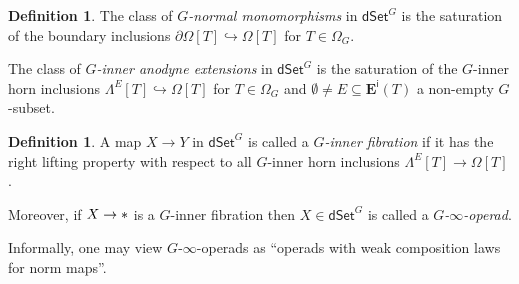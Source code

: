 \documentclass[a4paper,10pt
,draft
]{article}%
\numberwithin{equation}{section}
\numberwithin{figure}{section}
\theoremstyle{definition} %
\newtheorem{definition}[equation]{Definition}%
\newtheorem{example}[equation]{Example}%
\newcommand{\into}{\hookrightarrow}%
\newcommand{\dSet}{\mathsf{dSet}}
\DeclareMathOperator{\Hom}{Hom}%
\newcommand{\1}{\ensuremath{\mathbbm 1}}%
\begin{document}
\begin{definition}\label{GINNERANN DEF}
	The class of \textit{$G$-normal monomorphisms}
	in $\mathsf{dSet}^G$
	is the saturation of the boundary inclusions 
	$\partial \Omega[T] \into \Omega[T]$ for $T \in \Omega_G$.
	
	The class of \textit{$G$-inner anodyne extensions}
	in $\mathsf{dSet}^G$
	is the saturation of the $G$-inner horn inclusions
	$\Lambda^E [T] \into \Omega[T]$ 
	for $T \in \Omega_G$ and 
	$\emptyset \neq E \subseteq
	\boldsymbol{E}^{\mathsf{i}}(T)$
	a non-empty $G$-subset.
\end{definition}



\begin{definition}\label{GINNERFIB DEF}
	A map $X \to Y$ in $\dSet^G$
	is called a \emph{$G$-inner fibration}
	if it has the right lifting property
	with respect to all $G$-inner horn inclusions
	$\Lambda^E[T] \to \Omega[T]$.
	
	Moreover, 
	if $X \to \**$
	is a $G$-inner fibration
	then 
	$X \in \dSet^G$ is called a \textit{$G$-$\infty$-operad}.
\end{definition}


Informally, one may view
$G$-$\infty$-operads as
``operads with weak composition laws for norm maps''.


\end{document}

